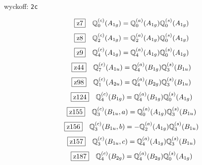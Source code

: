 \documentclass[fleqn,10pt,landscape]{jsarticle}
\begin{document}
\noindent\quad * wyckoff: \texttt{2c}

\begin{dmath*}
\hspace*{3mm}\fbox{z7}\quad \mathbb{Q}_{0}^{(c)}(A_{1g})=\mathbb{Q}_{0}^{(a)}(A_{1g}) \mathbb{Q}_{0}^{(s)}(A_{1g})
\end{dmath*}
\begin{dmath*}
\hspace*{3mm}\fbox{z8}\quad \mathbb{Q}_{2}^{(c)}(A_{1g})=\mathbb{Q}_{2}^{(a)}(A_{1g}) \mathbb{Q}_{0}^{(s)}(A_{1g})
\end{dmath*}
\begin{dmath*}
\hspace*{3mm}\fbox{z9}\quad \mathbb{Q}_{4}^{(c)}(A_{1g})=\mathbb{Q}_{4}^{(a)}(A_{1g}) \mathbb{Q}_{0}^{(s)}(A_{1g})
\end{dmath*}
\begin{dmath*}
\hspace*{3mm}\fbox{z44}\quad \mathbb{Q}_{7}^{(c)}(A_{1u})=\mathbb{Q}_{4}^{(a)}(B_{1g}) \mathbb{Q}_{3}^{(s)}(B_{1u})
\end{dmath*}
\begin{dmath*}
\hspace*{3mm}\fbox{z98}\quad \mathbb{Q}_{1}^{(c)}(A_{2u})=\mathbb{Q}_{4}^{(a)}(B_{2g}) \mathbb{Q}_{3}^{(s)}(B_{1u})
\end{dmath*}
\begin{dmath*}
\hspace*{3mm}\fbox{z124}\quad \mathbb{Q}_{4}^{(c)}(B_{1g})=\mathbb{Q}_{4}^{(a)}(B_{1g}) \mathbb{Q}_{0}^{(s)}(A_{1g})
\end{dmath*}
\begin{dmath*}
\hspace*{3mm}\fbox{z155}\quad \mathbb{Q}_{3}^{(c)}(B_{1u},a)=\mathbb{Q}_{0}^{(a)}(A_{1g}) \mathbb{Q}_{3}^{(s)}(B_{1u})
\end{dmath*}
\begin{dmath*}
\hspace*{3mm}\fbox{z156}\quad \mathbb{Q}_{3}^{(c)}(B_{1u},b)=- \mathbb{Q}_{2}^{(a)}(A_{1g}) \mathbb{Q}_{3}^{(s)}(B_{1u})
\end{dmath*}
\begin{dmath*}
\hspace*{3mm}\fbox{z157}\quad \mathbb{Q}_{3}^{(c)}(B_{1u},c)=\mathbb{Q}_{4}^{(a)}(A_{1g}) \mathbb{Q}_{3}^{(s)}(B_{1u})
\end{dmath*}
\begin{dmath*}
\hspace*{3mm}\fbox{z187}\quad \mathbb{Q}_{4}^{(c)}(B_{2g})=\mathbb{Q}_{4}^{(a)}(B_{2g}) \mathbb{Q}_{0}^{(s)}(A_{1g})
\end{dmath*}
\end{document}
